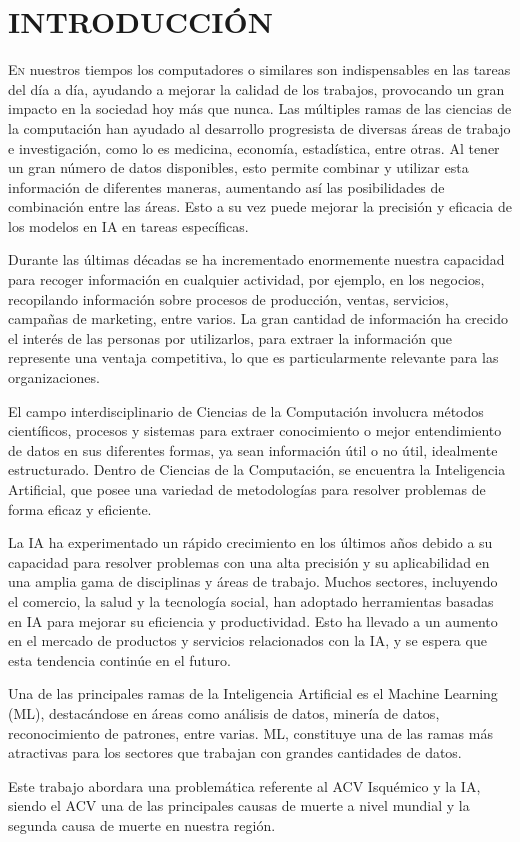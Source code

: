\doublespacing
\chapter{INTRODUCCIÓN}
\lettrine[lines=4, slope=0.1em, findent=0.2em, nindent=0.6em]{E}{n} nuestros tiempos los computadores o similares son indispensables en las tareas del día a día, ayudando a mejorar la calidad de los trabajos, provocando un gran impacto en la sociedad hoy más que nunca. Las múltiples ramas de las ciencias de la computación han ayudado al desarrollo progresista de diversas áreas de trabajo e investigación, como lo es medicina, economía, estadística, entre otras. Al tener un gran número de datos disponibles, esto permite combinar y utilizar esta información de diferentes maneras, aumentando así las posibilidades de combinación entre las áreas. Esto a su vez puede mejorar la precisión y eficacia de los modelos en IA en tareas específicas.\\
\par Durante las últimas décadas se ha incrementado enormemente nuestra capacidad para recoger información en cualquier actividad, por ejemplo, en los negocios, recopilando información sobre procesos de producción, ventas, servicios, campañas de marketing, entre varios. La gran cantidad de información ha crecido el interés de las personas por utilizarlos, para extraer la información que represente una ventaja competitiva, lo que es particularmente relevante para las organizaciones.\\ 
\par El campo interdisciplinario de Ciencias de la Computación involucra métodos científicos, procesos y sistemas para extraer conocimiento o mejor entendimiento de datos en sus diferentes formas, ya sean información útil o no útil, idealmente estructurado. Dentro de Ciencias de la Computación, se encuentra la Inteligencia Artificial, que posee una variedad de metodologías para resolver problemas de forma eficaz y eficiente. \\
\par La IA ha experimentado un rápido crecimiento en los últimos años debido a su capacidad para resolver problemas con una alta precisión y su aplicabilidad en una amplia gama de disciplinas y áreas de trabajo. Muchos sectores, incluyendo el comercio, la salud y la tecnología social, han adoptado herramientas basadas en IA para mejorar su eficiencia y productividad. Esto ha llevado a un aumento en el mercado de productos y servicios relacionados con la IA, y se espera que esta tendencia continúe en el futuro.\\
\par Una de las principales ramas de la Inteligencia Artificial es el Machine Learning (ML), destacándose en áreas como análisis de datos, minería de datos, reconocimiento de patrones, entre varias. ML, constituye una de las ramas más atractivas para los sectores que trabajan con grandes cantidades de datos.\\
\par Este trabajo abordara una problemática referente al ACV Isquémico y la IA,  siendo el ACV una de las principales causas de muerte a nivel mundial y la segunda causa de muerte en nuestra región.


